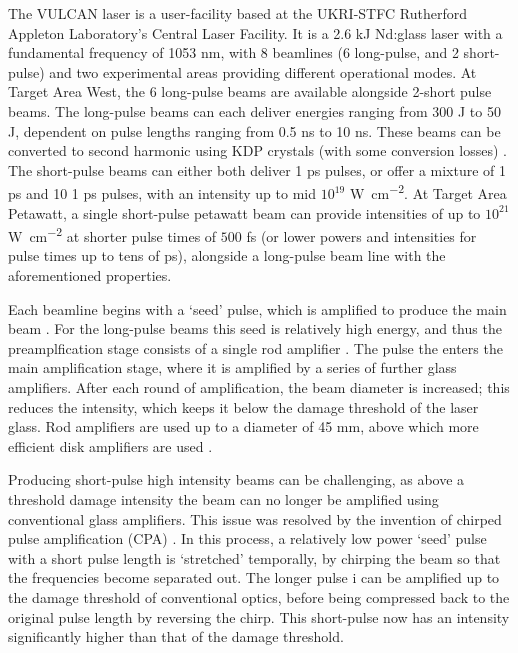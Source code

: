 The VULCAN laser is a user-facility based at the UKRI-STFC Rutherford Appleton Laboratory's Central Laser Facility. It is a 2.6 kJ Nd:glass laser with a fundamental frequency of 1053 \unit{\nano\meter}, with 8 beamlines (6 long-pulse, and 2 short-pulse) and two experimental areas providing different operational modes. At Target Area West, the 6 long-pulse beams are available alongside 2-short pulse beams. The long-pulse beams can each deliver energies ranging from 300 \unit{\joule} to 50 \unit{\joule}, dependent on pulse lengths ranging from 0.5 \unit{\nano\second} to 10 \unit{\nano\second}. These beams can be converted to second harmonic using KDP crystals (with some conversion losses) \cite{Ross1981}. The short-pulse beams can either both deliver 1 \unit{\pico\second} pulses, or offer a mixture of 1 \unit{\pico\second} and 10 1 \unit{\pico\second} pulses, with an intensity up to mid $10^{19}$ \unit{\watt\per\centi\meter\squared}. At Target Area Petawatt, a single short-pulse petawatt beam can provide intensities of up to $10^{21}$ \unit{\watt\per\centi\meter\squared} at shorter pulse times of $500$ \unit{\femto\second} (or lower powers and intensities for pulse times up to tens of \unit{\pico\second}), alongside a long-pulse beam line with the aforementioned properties.

Each beamline begins with a `seed' pulse, which is amplified to produce the main beam \cite{Ross1981}. For the long-pulse beams this seed is relatively high energy, and thus the preamplfication stage consists of a single rod amplifier \cite{Springate2010}. The pulse the enters the main amplification stage, where it is amplified by a series of further glass amplifiers. After each round of amplification, the beam diameter is increased; this reduces the intensity, which keeps it below the damage threshold of the laser glass. Rod amplifiers are used up to a diameter of 45 \unit{\milli\meter}, above which more efficient disk amplifiers are used \cite{Springate2010}. 

Producing short-pulse high intensity beams can be challenging, as above a threshold damage intensity the beam can no longer be amplified using conventional glass amplifiers. This issue was resolved by the invention of chirped pulse amplification (CPA) \cite{Strickland1985}. In this process, a relatively low power `seed' pulse with a short pulse length is `stretched' temporally, by chirping the beam so that the frequencies become separated out. The longer pulse i can be amplified up to the damage threshold of conventional optics, before being compressed back to the original pulse length by reversing the chirp. This short-pulse now has an intensity significantly higher than that of the damage threshold.

